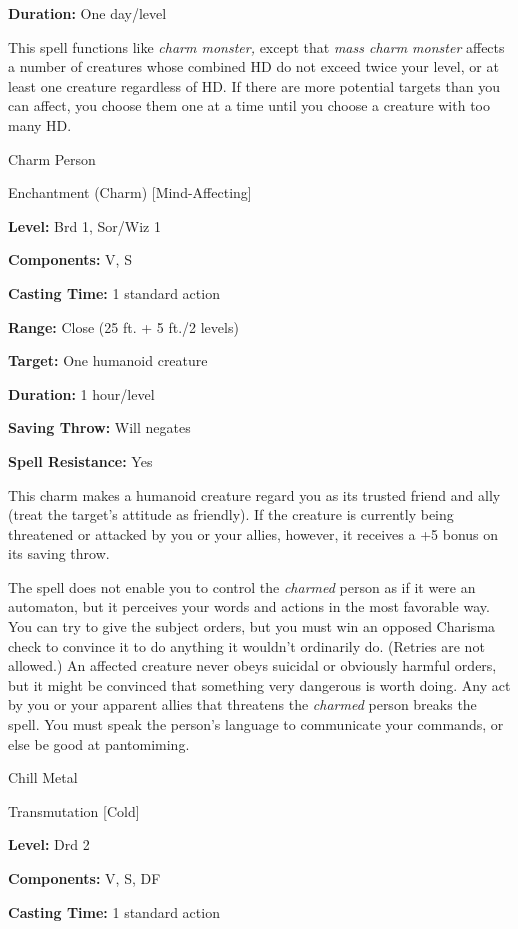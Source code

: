 \documentclass{article}
\begin{document}
\textbf{Duration:} One day/level

This spell functions like \textit{charm monster, }except that \textit{mass charm 
monster }affects a number of creatures whose combined HD do not exceed twice your 
level, or at least one creature regardless of HD. If there are more potential targets 
than you can affect, you choose them one at a time until you choose a creature 
with too many HD.

\vspace{12pt}
Charm Person

Enchantment (Charm) [Mind-Affecting]

\textbf{Level:} Brd 1, Sor/Wiz 1

\textbf{Components:} V, S

\textbf{Casting Time:} 1 standard action

\textbf{Range:} Close (25 ft. + 5 ft./2 levels)

\textbf{Target:} One humanoid creature

\textbf{Duration:} 1 hour/level

\textbf{Saving Throw: }Will negates

\textbf{Spell Resistance:} Yes

This charm makes a humanoid creature regard you as its trusted friend and ally 
(treat the target's attitude as friendly). If the creature is currently being threatened 
or attacked by you or your allies, however, it receives a +5 bonus on its saving 
throw.

The spell does not enable you to control the \textit{charmed }person as if it were 
an automaton, but it perceives your words and actions in the most favorable way. 
You can try to give the subject orders, but you must win an opposed Charisma check 
to convince it to do anything it wouldn't ordinarily do. (Retries are not allowed.) 
An affected creature never obeys suicidal or obviously harmful orders, but it might 
be convinced that something very dangerous is worth doing.  Any act by you or your 
apparent allies that threatens the \textit{charmed }person breaks the spell. You 
must speak the person's language to communicate your commands, or else be good 
at pantomiming.

\vspace{12pt}
Chill Metal

Transmutation [Cold]

\textbf{Level:} Drd 2

\textbf{Components:} V, S, DF

\textbf{Casting Time:} 1 standard action
\end{document}

